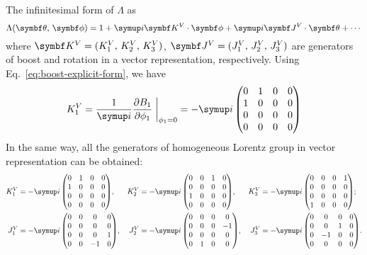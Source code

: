 The infinitesimal form of $\Lambda$ as
\begin{equation} \label{eq:Lambda-infinitesimal-form}
  \Lambda(\V{\theta}, \, \V{\phi})
  = 1 + \ii\V{K}^V\cdot\V{\phi} + \ii\V{J}^V\cdot\V{\theta} + \cdots
\end{equation}
where $\V{K}^V=(K_1^V, \, K_2^V, \, K_3^V)$, $\V{J}^V = (J_1^V, \, J_2^V, \, J_3^V)$ are generators
of boost and rotation in a vector representation, respectively. Using
Eq.~\eqref{eq:boost-explicit-form}, we have
\begin{equation} \label{eq:K1-vector-representation}
  K_1^V = \frac{1}{\ii}\pdv{B_1}{\f_1}\eval{}_{\f_1=0}
        = -\ii \, \mqty(0 & 1 & 0 & 0 \\
                        1 & 0 & 0 & 0 \\
                        0 & 0 & 0 & 0 \\
                        0 & 0 & 0 & 0)
\end{equation}
In the same way, all the generators of homogeneous Lorentz group in vector representation can be
obtained:
\begin{align}
  K_1^V &= -\ii \, \mqty(0 &  1 &  0 &  0  \\
                         1 &  0 &  0 &  0  \\
                         0 &  0 &  0 &  0  \\
                         0 &  0 &  0 &  0), &
  K_2^V &= -\ii \, \mqty(0 &  0 &  1 &  0  \\
                         0 &  0 &  0 &  0  \\
                         1 &  0 &  0 &  0  \\
                         0 &  0 &  0 &  0), &
  K_3^V &= -\ii \, \mqty(0 &  0 &  0 &  1  \\
                         0 &  0 &  0 &  0  \\
                         0 &  0 &  0 &  0  \\
                         1 &  0 &  0 &  0); \label{eq:K-vector-representation} \\
  J_1^V &= -\ii \, \mqty(0 &  0 &  0 &  0  \\
                         0 &  0 &  0 &  0  \\
                         0 &  0 &  0 &  1  \\
                         0 &  0 & -1 &  0), &
  J_2^V &= -\ii \, \mqty(0 &  0 &  0 &  0  \\
                         0 &  0 &  0 & -1  \\
                         0 &  0 &  0 &  0  \\
                         0 &  1 &  0 &  0), &
  J_3^V &= -\ii \, \mqty(0 &  0 &  0 &  0  \\
                         0 &  0 &  1 &  0  \\
                         0 & -1 &  0 &  0  \\
                         0 &  0 &  0 &  0). \label{eq:J-vector-representation}
\end{align}
